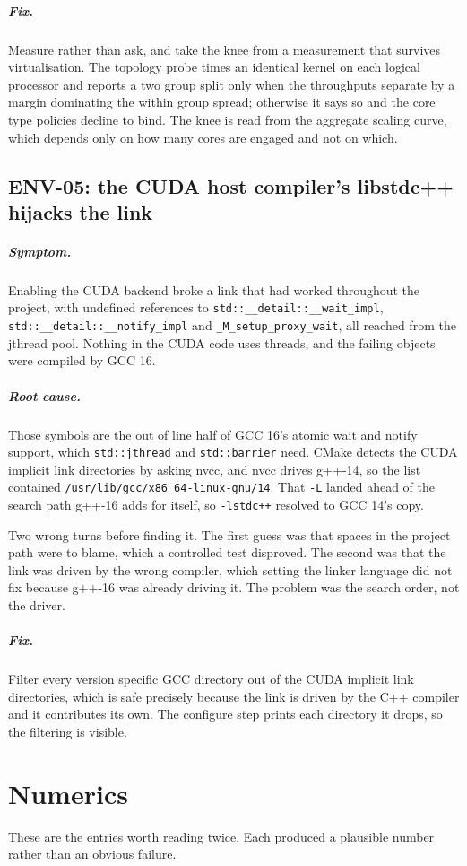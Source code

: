 \documentclass[11pt,a4paper]{report}
\newcommand{\symptom}[1]{\paragraph{Symptom.}#1}
\newcommand{\rootcause}[1]{\paragraph{Root cause.}#1}
\newcommand{\fix}[1]{\paragraph{Fix.}#1}
\begin{document}
\fix{Measure rather than ask, and take the knee from a measurement that survives
virtualisation. The topology probe times an identical kernel on each logical
processor and reports a two group split only when the throughputs separate by a
margin dominating the within group spread; otherwise it says so and the core
type policies decline to bind. The knee is read from the aggregate scaling
curve, which depends only on how many cores are engaged and not on which.}

\section{ENV-05: the CUDA host compiler's libstdc++ hijacks the link}

\symptom{Enabling the CUDA backend broke a link that had worked throughout the
project, with undefined references to \texttt{std::\_\_detail::\_\_wait\_impl},
\texttt{std::\_\_detail::\_\_notify\_impl} and
\texttt{\_M\_setup\_proxy\_wait}, all reached from the jthread pool. Nothing in
the CUDA code uses threads, and the failing objects were compiled by GCC 16.}

\rootcause{Those symbols are the out of line half of GCC 16's atomic wait and
notify support, which \texttt{std::jthread} and \texttt{std::barrier} need. CMake
detects the CUDA implicit link directories by asking nvcc, and nvcc drives
g++-14, so the list contained \texttt{/usr/lib/gcc/x86\_64-linux-gnu/14}. That
\texttt{-L} landed ahead of the search path g++-16 adds for itself, so
\texttt{-lstdc++} resolved to GCC 14's copy.

Two wrong turns before finding it. The first guess was that spaces in the project
path were to blame, which a controlled test disproved. The second was that the
link was driven by the wrong compiler, which setting the linker language did not
fix because g++-16 was already driving it. The problem was the search order, not
the driver.}

\fix{Filter every version specific GCC directory out of the CUDA implicit link
directories, which is safe precisely because the link is driven by the C++
compiler and it contributes its own. The configure step prints each directory it
drops, so the filtering is visible.}

\chapter{Numerics}

These are the entries worth reading twice. Each produced a plausible number
rather than an obvious failure.
\end{document}
